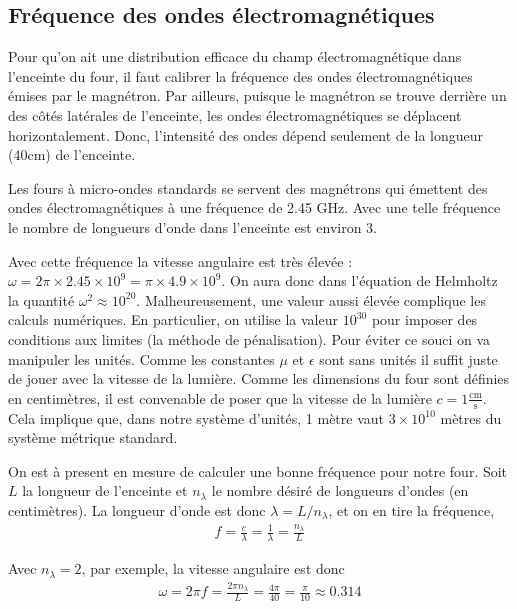\subsection{Fréquence des ondes électromagnétiques}

Pour qu'on ait une distribution efficace du champ électromagnétique
dans l'enceinte du four, il faut calibrer la fréquence des ondes
électromagnétiques émises par le magnétron. Par ailleurs, puisque le
magnétron se trouve derrière un des côtés
latérales de l'enceinte, les ondes électromagnétiques se déplacent
horizontalement. Donc, l'intensité des ondes dépend seulement de la
longueur (40cm) de l'enceinte.

Les fours à micro-ondes standards se servent des magnétrons qui émettent
des ondes électromagnétiques à une fréquence de 2.45 GHz. Avec une telle
fréquence le nombre de longueurs d'onde dans l'enceinte
est environ 3.

Avec cette fréquence la vitesse angulaire est très élevée :
$\omega = 2 \pi \times 2.45 \times 10^9 = \pi \times 4.9 \times 10^9$.
On aura donc dans l'équation de Helmholtz la quantité $\omega^2 \approx 10^{20}$.
Malheureusement, une valeur aussi élevée complique les calculs
numériques. En particulier, on utilise la valeur $10^{30}$ pour imposer
des conditions aux limites (la méthode de pénalisation). Pour éviter ce
souci on va manipuler les unités. Comme les constantes $\mu$ et
$\epsilon$ sont sans unités il
suffit juste de jouer avec la vitesse de la lumière.
Comme les dimensions du four sont définies en centimètres, il est
convenable de poser que la vitesse de la lumière $c = 1\frac{\text{cm}}{\text{s}}$.
Cela implique que, dans notre système d'unités, 1 mètre vaut
$3 \times 10^{10}$ mètres du système métrique standard.

On est à present en mesure de calculer une bonne fréquence pour
notre four. Soit $L$ la longueur de l'enceinte et $n_\lambda$
le nombre désiré de longueurs d'ondes (en centimètres).
La longueur d'onde est donc $\lambda = L / n_\lambda$, et on en tire
la fréquence,
\begin{align}
    f = \frac{c}{\lambda} = \frac{1}{\lambda} = \frac{n_\lambda}{L}
\end{align}


Avec $n_\lambda = 2$, par exemple, la vitesse angulaire est donc
\begin{align}
    \omega = 2 \pi f = \frac{2 \pi n_\lambda}{L}
    = \frac{4 \pi}{40} = \frac{\pi}{10} \approx 0.314
\end{align}

